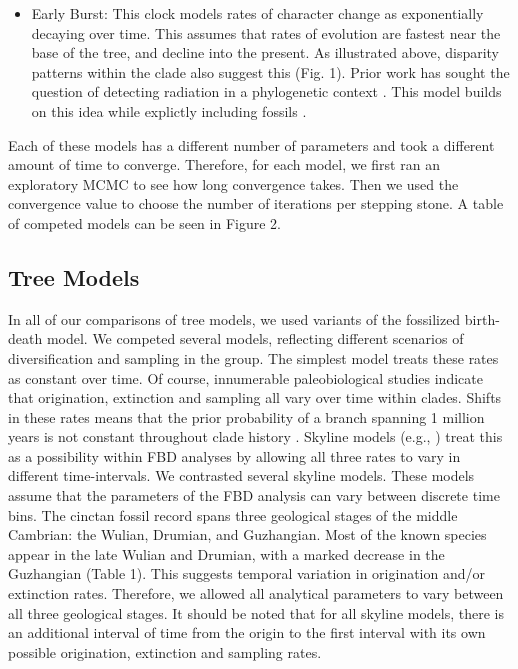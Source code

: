\documentclass{article}
\begin{document}
\begin{itemize}
    \item Early Burst: This clock models rates of character change as exponentially decaying over time. 
    This assumes that rates of evolution are fastest near the base of the tree, and decline into the present. 
    As illustrated above, disparity patterns within the clade also suggest this (Fig. 1).
    Prior work has sought the question of detecting radiation in a phylogenetic context \citep{Liow2010}.
    This model builds on this idea while explictly including fossils \citep{Quental2009, Quental2010}. %
\end{itemize}

Each of these models has a different number of parameters and took a different amount of time to converge. Therefore, for each model, we first ran an exploratory MCMC to see how long convergence takes. Then we used the convergence value to choose the number of iterations per stepping stone.
A table of competed models can be seen in Figure 2.

\subsection{Tree Models}

In all of our comparisons of tree models, we used variants of the fossilized birth-death model.
We competed several models, reflecting different scenarios of diversification and sampling in the group.
The simplest model treats these rates as constant over time.  
Of course, innumerable paleobiological studies indicate that origination, extinction and sampling all vary over time within clades.  Shifts in these rates means that the prior probability of a branch spanning 1 million years is not constant throughout clade history \citep{Wagner2019}. %
Skyline models (e.g., \citealp{Stadler2013b}) treat this as a possibility within FBD analyses by allowing all three rates to vary in different time-intervals. 
We contrasted several skyline models. %
These models assume that the parameters of the FBD analysis can vary between discrete time bins. The cinctan fossil record spans three geological stages of the middle Cambrian: the Wulian, Drumian, and Guzhangian. Most of the known species appear in the late Wulian and Drumian, with a marked decrease in the Guzhangian (Table 1).  This suggests temporal variation in origination and/or extinction rates.
Therefore, we allowed all analytical parameters to vary between all three geological stages.
It should be noted that for all skyline models, there is an additional interval of time from the origin to the first interval with its own possible origination, extinction and sampling rates.
\end{document}
